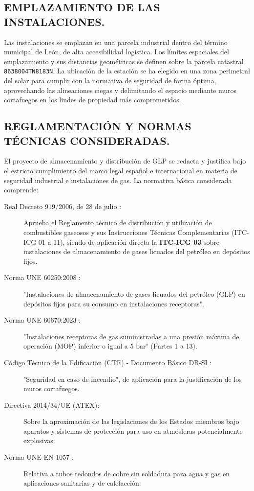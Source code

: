 \documentclass[12pt]{article}
\begin{document}
        \subsection{EMPLAZAMIENTO DE LAS INSTALACIONES.}
        Las instalaciones se emplazan en una parcela industrial dentro del término municipal de León, de alta accesibilidad logística. Los límites espaciales del emplazamiento y sus distancias geométricas se definen sobre la parcela catastral \texttt{8638004TN8183N}. La ubicación de la estación se ha elegido en una zona perimetral del solar para cumplir con la normativa de seguridad de forma óptima, aprovechando las alineaciones ciegas y delimitando el espacio mediante muros cortafuegos en los lindes de propiedad más comprometidos.

        \clearpage
        \subsection{REGLAMENTACIÓN Y NORMAS TÉCNICAS CONSIDERADAS.}
        El proyecto de almacenamiento y distribución de GLP se redacta y justifica bajo el estricto cumplimiento del marco legal español e internacional en materia de seguridad industrial e instalaciones de gas. La normativa básica considerada comprende:
        
        \begin{description}
            \item[Real Decreto 919/2006, de 28 de julio \cite{rd919}:] Aprueba el Reglamento técnico de distribución y utilización de combustibles gaseosos y sus Instrucciones Técnicas Complementarias (ITC-ICG 01 a 11), siendo de aplicación directa la \textbf{ITC-ICG 03} sobre instalaciones de almacenamiento de gases licuados del petróleo en depósitos fijos.
            \item[Norma UNE 60250:2008 \cite{une60250}:] "Instalaciones de almacenamiento de gases licuados del petróleo (GLP) en depósitos fijos para su consumo en instalaciones receptoras".
            \item[Norma UNE 60670:2023 \cite{une60670}:] "Instalaciones receptoras de gas suministradas a una presión máxima de operación (MOP) inferior o igual a $5\text{ bar}$" (Partes 1 a 13).
            \item[Código Técnico de la Edificación (CTE) - Documento Básico DB-SI \cite{rd314}:] "Seguridad en caso de incendio", de aplicación para la justificación de los muros cortafuegos.
            \item[Directiva 2014/34/UE (ATEX):] Sobre la aproximación de las legislaciones de los Estados miembros bajo aparatos y sistemas de protección para uso en atmósferas potencialmente explosivas.
            \item[Norma UNE-EN 1057 \cite{une1057}:] Relativa a tubos redondos de cobre sin soldadura para agua y gas en aplicaciones sanitarias y de calefacción.
        \end{description}
\end{document}
